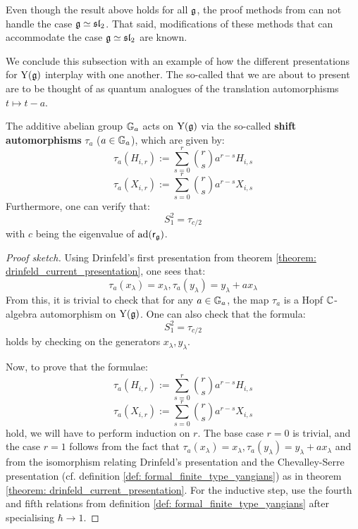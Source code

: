         \begin{remark}
            Even though the result above holds for all $\mathfrak{g}$, the proof methods from \cite[Theorem 4.9]{guay_nakajima_wendlandt_affine_yangian_coproduct} can not handle the case $\mathfrak{g} \simeq \mathfrak{sl}_2$. That said, modifications of these methods that can accommodate the case $\mathfrak{g} \simeq \mathfrak{sl}_2$ are known. 
        \end{remark}

        We conclude this subsection with an example of how the different presentations for $\mathrm{Y}(\mathfrak{g})$ interplay with one another. The so-called  that we are about to present are to be thought of as quantum analogues of the translation automorphisms $t \mapsto t - a$.
        \begin{proposition} \label{prop: finite_type_yangians_shift_automorphisms}
            \cite[Proposition 12.1.5]{chari_pressley_quantum_groups} The additive abelian group $\mathbb{G}_a$ acts on $\mathrm{Y}(\mathfrak{g})$ via the so-called \textbf{shift automorphisms} $\tau_a$ ($a \in \mathbb{G}_a$), which are given by:
                $$\tau_a(H_{i, r}) := \sum_{s = 0}^r \binom{r}{s} a^{r - s} H_{i, s}$$
                $$\tau_a(X_{i, r}) := \sum_{s = 0}^r \binom{r}{s} a^{r - s} X_{i, s}$$
            Furthermore, one can verify that:
                $$S_1^2 = \tau_{c/2}$$
            with $c$ being the eigenvalue of $\mathrm{ad}(\mathsf{r}_{\mathfrak{g}})$.
        \end{proposition}
            \begin{proof}[Proof sketch]
                Using Drinfeld's first presentation from theorem \ref{theorem: drinfeld_current_presentation}, one sees that:
                    $$\tau_a(x_{\lambda}) = x_{\lambda}, \tau_a(y_{\lambda}) = y_{\lambda} + a x_{\lambda}$$
                From this, it is trivial to check that for any $a \in \mathbb{G}_a$, the map $\tau_a$ is a Hopf $\mathbb{C}$-algebra automorphism on $\mathrm{Y}(\mathfrak{g})$. One can also check that the formula:
                    $$S_1^2 = \tau_{c/2}$$
                holds by checking on the generators $x_{\lambda}, y_{\lambda}$. 

                Now, to prove that the formulae:
                    $$\tau_a(H_{i, r}) := \sum_{s = 0}^r \binom{r}{s} a^{r - s} H_{i, s}$$
                    $$\tau_a(X_{i, r}) := \sum_{s = 0}^r \binom{r}{s} a^{r - s} X_{i, s}$$
                hold, we will have to perform induction on $r$. The base case $r = 0$ is trivial, and the case $r = 1$ follows from the fact that $\tau_a(x_{\lambda}) = x_{\lambda}, \tau_a(y_{\lambda}) = y_{\lambda} + a x_{\lambda}$ and from the isomorphism relating Drinfeld's presentation and the Chevalley-Serre presentation (cf. definition \ref{def: formal_finite_type_yangians}) as in theorem \ref{theorem: drinfeld_current_presentation}. For the inductive step, use the fourth and fifth relations from definition \ref{def: formal_finite_type_yangians} after specialising $\hbar \to 1$. 
            \end{proof}

